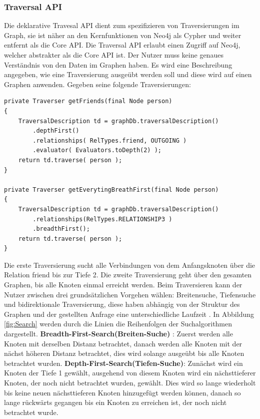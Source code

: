 \subsubsection{Traversal API}
Die deklarative Travesal API dient zum spezifizieren von Traversierungen im Graph, sie ist näher an den Kernfunktionen von Neo4j als Cypher und weiter entfernt als die Core API. Die Traversal API erlaubt einen Zugriff auf Neo4j, welcher  abstrakter als die Core API ist. Der Nutzer muss keine genaues Verständnis von den Daten im Graphen haben. Es wird eine Beschreibung angegeben, wie eine Traversierung  ausgeübt werden soll und diese wird auf einen Graphen anwenden. Gegeben seine folgende Traversierungen:
\begin{Verbatim}[frame=single]
private Traverser getFriends(final Node person)
{
	TraversalDescription td = graphDb.traversalDescription()
		.depthFirst()
		.relationships( RelTypes.friend, OUTGOING )
		.evaluator( Evaluators.toDepth(2) );
	return td.traverse( person );
}

private Traverser getEverytingBreathFirst(final Node person)
{
	TraversalDescription td = graphDb.traversalDescription()
		.relationships(RelTypes.RELATIONSHIP3 )
		.breadthFirst();
	return td.traverse( person );
}
\end{Verbatim}
Die erste Traversierung sucht alle Verbindungen von dem Anfangsknoten über die Relation friend bis zur Tiefe 2. Die zweite Traversierung geht über den gesamten Graphen, bis alle Knoten einmal erreicht werden. Beim Traversieren kann der  Nutzer zwischen drei grundsätzlichen Vorgehen wählen: Breitensuche, Tiefensuche und bidirektionale Traversierung, diese haben abhängig von der Struktur des Graphen und der gestellten Anfrage eine unterschiedliche Laufzeit \parencite{vukotic2015neo4j}. In  Abbildung \ref{fig:Search} werden durch die Linien die Reihenfolgen der Suchalgorithmen dargestellt. \newline
\textbf {Breadth-First-Search(Breiten-Suche)} : Zuerst werden alle Knoten mit derselben Distanz betrachtet, danach werden alle Knoten mit der nächst höheren Distanz betrachtet, dies wird solange ausgeübt bis alle Knoten betrachtet wurden. \newline
\textbf {Depth-First-Search(Tiefen-Suche)}: Zunächst wird ein Knoten der Tiefe 1 gewählt, ausgehend von diesem Knoten wird ein nächsttieferer Knoten, der noch nicht betrachtet wurden, gewählt. Dies wird so lange wiederholt bis keine neuen nächsttieferen Knoten hinzugefügt werden können, danach so lange rückwärts gegangen bis ein Knoten zu erreichen ist, der noch nicht betrachtet wurde. \newline
